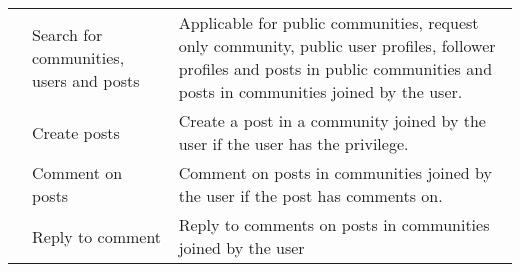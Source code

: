 \documentclass[conference,compsoc]{IEEEtran}
\begin{document}
\begin{table}[H]
\begin{tabular}{|M{2cm}|p{2.3cm}|p{3.2cm}|}
                                           & Search for communities, users and posts                        & Applicable for public communities, request only community, public user profiles, follower profiles and posts in public communities and posts in communities joined by the user. \\
                                           & Create posts                                                   & Create a post in a community joined by the user if the user has the privilege.                                                                                                  \\
                                           & Comment on posts                                               & Comment on posts in communities joined by the user if the post has comments on.                                                                                                 \\
                                           & Reply to comment                                               & Reply to comments on posts in communities joined by the user                                                                                                                    \\
    \end{tabular}
\end{table}
\end{document}
